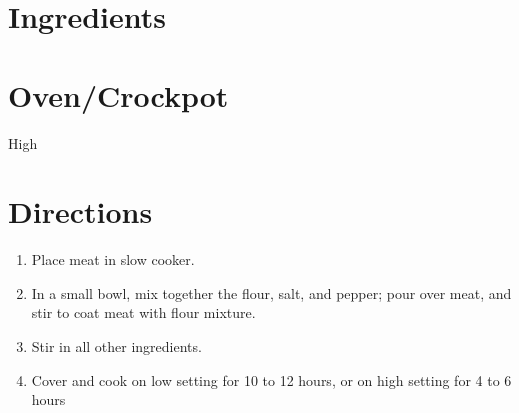 \documentclass[letterpaper,10pt,english]{sphinxmanual}
\begin{document}
\section{Ingredients}
\label{\detokenize{Crockpot_Beef_Stew:ingredients}}
%
\begin{sphinxVerbatim}[commandchars=\\\{\}]
        

   

  

    

   

  

  

   

  

        

  

  

   
\end{sphinxVerbatim}


\section{Oven/Crockpot}
\label{\detokenize{Crockpot_Beef_Stew:oven-crockpot}}
High


\section{Directions}
\label{\detokenize{Crockpot_Beef_Stew:directions}}\begin{enumerate}
\item {} 
Place meat in slow cooker.

\item {} 
In a small bowl, mix together the flour, salt, and pepper; pour over meat, and stir to coat meat with flour mixture.

\item {} 
Stir in all other ingredients.

\item {} 
Cover and cook on low setting for 10 to 12 hours, or on high setting for 4 to 6 hours

\end{enumerate}
\end{document}
